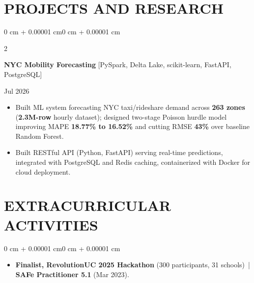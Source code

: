 \documentclass[10pt, letterpaper]{article}
\newenvironment{highlights}{
    \begin{itemize}[
        topsep=0.10 cm,
        parsep=0.06 cm,
        partopsep=0pt,
        itemsep=0.06 cm,
        leftmargin=12pt
    ]
}{
    \end{itemize}
}
\newenvironment{onecolentry}{
    \begin{adjustwidth}{0 cm + 0.00001 cm}{0 cm + 0.00001 cm}
}{
    \end{adjustwidth}
}
\newenvironment{twocolentry}[2][]{
    \onecolentry
    \def\secondColumn{#2}
    \setcolumnwidth{\fill, 4.5 cm}
    \begin{paracol}{2}
}{
    \switchcolumn \raggedleft \secondColumn
    \end{paracol}
    \endonecolentry
}
\begin{document}
\section{PROJECTS AND RESEARCH}
\begin{twocolentry}{Jul 2026}
\textbf{NYC Mobility Forecasting} [PySpark, Delta Lake, scikit-learn, FastAPI, PostgreSQL]
\end{twocolentry}
\begin{highlights}
  \item Built ML system forecasting NYC taxi/rideshare demand across \textbf{263 zones} (\textbf{2.3M-row} hourly dataset); designed two-stage Poisson hurdle model improving MAPE \textbf{18.77\% to 16.52\%} and cutting RMSE \textbf{43\%} over baseline Random Forest.
  \item Built RESTful API (Python, FastAPI) serving real-time predictions, integrated with PostgreSQL and Redis caching, containerized with Docker for cloud deployment.
\end{highlights}

\section{EXTRACURRICULAR ACTIVITIES}
\begin{onecolentry}
\begin{highlights}
  \item \textbf{Finalist, RevolutionUC 2025 Hackathon} (300 participants, 31 schools) \,|\, \textbf{SAFe Practitioner 5.1} (Mar 2023).
\end{highlights}
\end{onecolentry}
\end{document}
